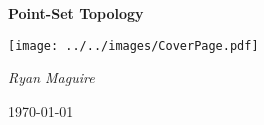 \documentclass{book}
\theoremstyle{plain}
\theoremstyle{normal}
\numberwithin{equation}{section}
\begin{document}
    \pagecolor{CoverPage}
    \begin{titlepage}
        \centering
        \LARGE{\bfseries{Point-Set Topology}}
        \par\vspace{3.5cm}
        \texttt{[image: ../../images/CoverPage.pdf]}
        \par\vspace{4cm}
        \Large{\itshape{Ryan Maguire}}
        \par\vspace{1.5ex}
        \normalsize{\today}
    \end{titlepage}
    \nopagecolor
    \tableofcontents
    \listoffigures
    \clearpage
    
    
    \newpage
    
    
    \newpage
\end{document}
